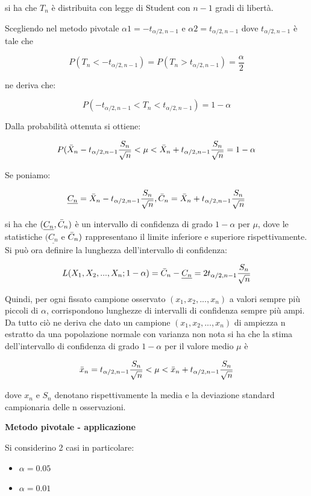 si ha che $T_n$ è distribuita con legge di Student con $n-1$ gradi di libertà.

Scegliendo nel metodo pivotale $\alpha1 = -t_{\alpha/2,n-1}$ e $\alpha2 = t_{\alpha/2,n-1}$ dove $t_{\alpha/2,n-1}$ è tale che 

\[P(T_n < -t_{\alpha/2,n-1}) = P(T_n>t_{\alpha/2,n-1}) = \frac{\alpha}{2}\]

ne deriva che:

\[P(-t_{\alpha/2,n-1} < T_n < t_{\alpha/2,n-1}) = 1-\alpha\]

Dalla probabilità ottenuta si ottiene:

\[P(\Bar{X}_n - t_{\alpha/2,n-1} \frac{S_n}{\sqrt{n}} <\mu < \Bar{X}_n + t_{\alpha/2,n-1}\frac{S_n}{\sqrt{n}} = 1- \alpha\]

Se poniamo:

\[\underline{C_n} = \Bar{X}_n - t_{\alpha/2,n-1}\frac{S_n}{\sqrt{n}}, \Bar{C}_n = \Bar{X}_n + t_{\alpha/2,n-1}\frac{S_n}{\sqrt{n}}\]

si ha che $(\underline{C_n}, \Bar{C}_n)$ è un intervallo di confidenza di grado $1 - \alpha$ per $\mu$, dove le statistiche $(\underline{C_n}$ e $\Bar{C}_n)$ rappresentano il limite inferiore e superiore rispettivamente. Si può ora definire la lunghezza dell'intervallo di confidenza:

\[L(X_1, X_2, ..., X_n;1-\alpha) = \Bar{C}_n - \underline{C_n} = 2t_{\alpha/2,n-1}\frac{S_n}{\sqrt{n}}\]

Quindi, per ogni fissato campione osservato $(x_1, x_2, ..., x_n)$ a valori sempre più piccoli di $\alpha$, corrispondono lunghezze di intervalli di confidenza sempre più ampi. Da tutto ciò ne deriva che dato un campione $(x_1, x_2, ..., x_n)$ di ampiezza n estratto da una popolazione normale con varianza non nota si ha che la stima dell'intervallo di confidenza di grado $1-\alpha$ per il valore medio $\mu$ è 

\[\Bar{x}_n = t_{\alpha/2,n-1}\frac{S_n}{\sqrt{n}} < \mu < \Bar{x}_n + t_{\alpha/2,n-1}\frac{S_n}{\sqrt{n}}\]

dove $x_n$ e $S_n$ denotano rispettivamente la media e la deviazione standard campionaria delle n osservazioni.

\vspace{5mm}
\noindent \textbf{Metodo pivotale - applicazione}

Si considerino 2 casi in particolare:

\begin{itemize}
    \item $\alpha = 0.05$
    \item $\alpha = 0.01$
\end{itemize}

